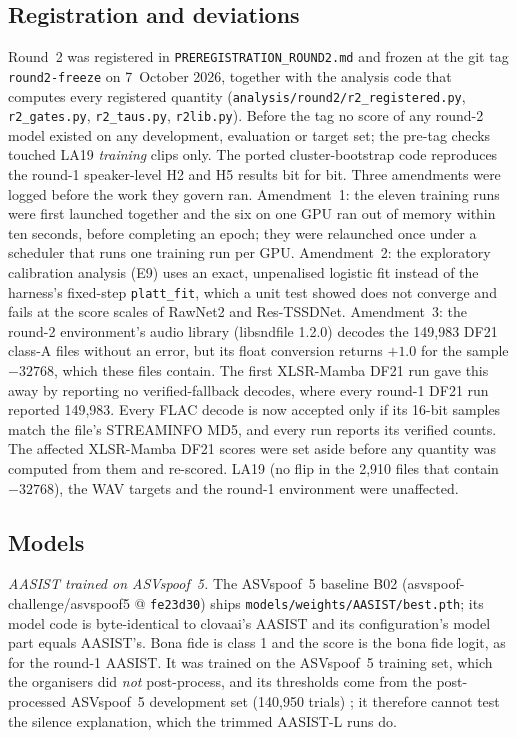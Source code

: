 \documentclass[10pt]{article}
\begin{document}
\subsection{Registration and deviations}
Round~2 was registered in \texttt{PREREGISTRATION\_ROUND2.md} and frozen at the git tag \texttt{round2-freeze} on
7~October 2026, together with the analysis code that computes every registered quantity
(\texttt{analysis/round2/r2\_registered.py}, \texttt{r2\_gates.py}, \texttt{r2\_taus.py}, \texttt{r2lib.py}). Before the tag no
score of any round-2 model existed on any development, evaluation or target set; the pre-tag checks touched LA19
\emph{training} clips only. The ported cluster-bootstrap code reproduces the round-1 speaker-level H2 and H5 results bit for
bit. Three amendments were logged before the work they govern ran. Amendment~1: the eleven training runs were first launched
together and the six on one GPU ran out of memory within ten seconds, before completing an epoch; they were relaunched once
under a scheduler that runs one training run per GPU. Amendment~2: the exploratory calibration analysis (E9) uses an exact,
unpenalised logistic fit instead of the harness's fixed-step \texttt{platt\_fit}, which a unit test showed does not converge
and fails at the score scales of RawNet2 and Res-TSSDNet. Amendment~3: the round-2 environment's audio library (libsndfile
1.2.0) decodes the 149,983 DF21 class-A files without an error, but its float conversion returns \(+1.0\) for the sample
\(-32768\), which these files contain. The first XLSR-Mamba DF21 run gave this away by reporting no verified-fallback
decodes, where every round-1 DF21 run reported 149,983. Every FLAC decode is now accepted only if its 16-bit samples match
the file's STREAMINFO MD5, and every run reports its verified counts. The affected XLSR-Mamba DF21 scores were set aside
before any quantity was computed from them and re-scored. LA19 (no flip in the 2,910 files that contain \(-32768\)), the WAV
targets and the round-1 environment were unaffected.

\subsection{Models}
\emph{AASIST trained on ASVspoof~5.} The ASVspoof~5 baseline B02 (asvspoof-challenge/asvspoof5 @ \texttt{fe23d30}) ships
\texttt{models/weights/AASIST/best.pth}; its model code is byte-identical to clovaai's AASIST and its configuration's model
part equals AASIST's. Bona fide is class 1 and the score is the bona fide logit, as for the round-1 AASIST. It was trained on
the ASVspoof~5 training set, which the organisers did \emph{not} post-process, and its thresholds come from the
post-processed ASVspoof~5 development set (140,950 trials) \cite{wang25_asvspoof5_db}; it therefore cannot test the silence
explanation, which the trimmed AASIST-L runs do.
\end{document}
